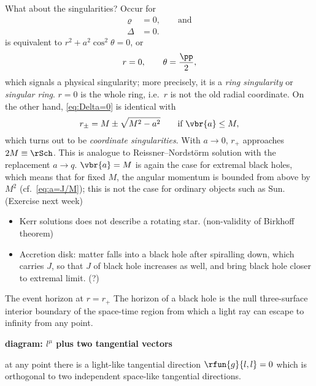 \begin{nameddef}{What about the singularities?}
Occur for
\begin{align}
\varrho &= 0, \qquad \text{and}
\label{eq:varrho=0} \\
\Delta &= 0.
\label{eq:Delta=0}
\end{align}
 is equivalent to $r^2+a^2\cos^2\theta = 0$, or
\begin{equation}
r = 0,\qquad\theta = \frac{\pp}{2},
\end{equation}
which signals a physical singularity; more precisely, it is a \emph{ring
singularity} or \emph{singular ring}. $r = 0$ is the whole ring, i.e.\ $r$
is not the old radial coordinate. On the other hand, \cref{eq:Delta=0} is
identical with
\begin{equation}
r_\pm = M \pm \sqrt{M^2 - a^2}\qquad\text{if }\vbr{a} \le M,
\end{equation}
which turns out to be \emph{coordinate singularities}. With $a \to 0$,
$r_+$ approaches $2M \equiv \rSch$. This is analogue to Reissner--Nordstörm
solution with the replacement $a \to q$. $\vbr{a} = M$ is again the case for
extremal black holes, which means that for fixed $M$, the angular momentum is
bounded from above by $M^2$ (cf.\ \cref{eq:a=J/M}); this is not the case
for ordinary objects such as Sun. (Exercise next week)
\end{nameddef} %

\begin{unamedrem}
\begin{itemize}
\item
Kerr solutions does not describe a rotating star. (non-validity of Birkhoff
theorem)
\item
Accretion disk: matter falls into a black hole after spiralling down, which
carries $J$, so that $J$ of black hole increases as well, and bring black
hole closer to extremal limit. (?)
\end{itemize}
\end{unamedrem}

\begin{nameddef}{The event horizon at $r = r_+$}
The horizon of a black hole is the null three-surface interior boundary of the
space-time region from which a light ray can escape to infinity from any
point.

\textbf{diagram: $l^\mu$ plus two tangential vectors}

at any point there is a light-like tangential direction $\rfun{g}{l, l} = 0$
which is orthogonal to two independent space-like tangential directions.
\end{nameddef} %

